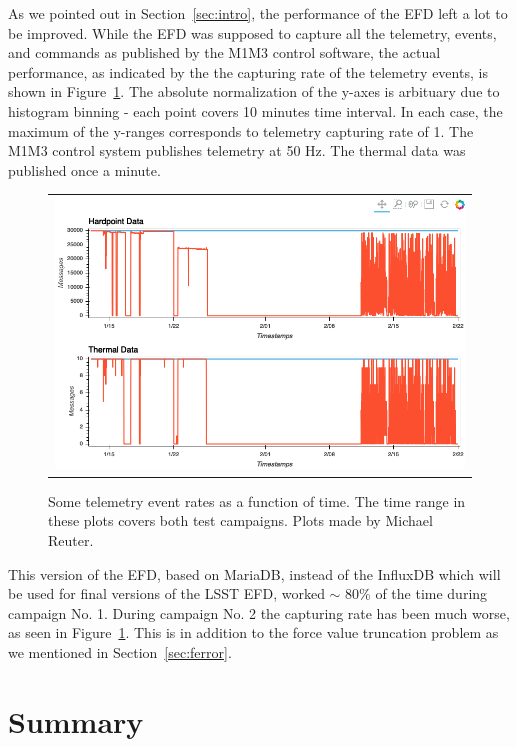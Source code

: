 \documentclass [twoside,openbib,12pt]{article}
\begin{document}
As we pointed out in Section~\ref{sec:intro}, the performance of the
EFD left a lot to be improved.
While the EFD was 
supposed to capture all the telemetry, events, and commands as
published by the M1M3 control software,
the actual performance, as indicated by the the capturing rate of the
telemetry events, is shown in Figure~\ref{fig:efd}.
The absolute normalization of the y-axes is arbituary due to histogram
binning - each point covers 10 minutes time interval.
In each case, the maximum of the y-ranges corresponds to telemetry
capturing rate of 1.
The M1M3 control system publishes telemetry at 50 Hz.
The thermal data was published once a minute.

 \begin{figure}[bthp]
   \begin{center}
     \begin{tabular}{c}
\includegraphics[width=170mm]{figures/EFD_messages_both_campaigns.png}
  \end{tabular}
   \end{center}
   \caption
   { \label{fig:efd}
Some telemetry event rates as a function of time. The time range in
these plots covers both test campaigns. Plots made by Michael Reuter.
 }
\end{figure}


This version of the EFD, based on MariaDB, instead of the InfluxDB
which will be used for final versions of the LSST EFD, worked $\sim$
80\% of the time during campaign No. 1.
During campaign No. 2 the capturing rate has been much worse, as seen
in Figure~\ref{fig:efd}.
This is in addition to the force value truncation problem as we
mentioned in Section~\ref{sec:ferror}.


\section{Summary}
\end{document}

